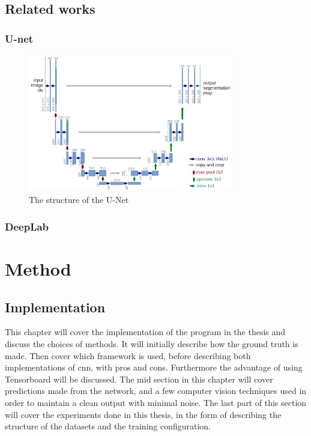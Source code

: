 \documentclass[USenglish]{ifimaster}  %
\begin{document}
\section{Related works}
\subsection{U-net}

\begin{figure}[ht]
    \centering
    \includegraphics[width=0.8\textwidth]{bilder/u_net.png}
    \caption{The structure of the U-Net \cite{website:u_net}}
    \label{fig:u_net}
\end{figure}

\subsection{DeepLab}

\chapter{Method}
\section{Implementation}
This chapter will cover the implementation of the program in the thesis and discuss the choices of methods. It will initially describe how the ground truth is made. Then cover which framework is used, before describing both implementations of \ac{cnn}, with pros and cons. Furthermore the advantage of using Tensorboard will be discussed. The mid section in this chapter will cover predictions made from the network, and a few computer vision techniques used in order to maintain a clean output with minimal noise. The last part of this section will cover the experiments done in this thesis, in the form of describing the structure of the datasets and the training configuration.
\end{document}
